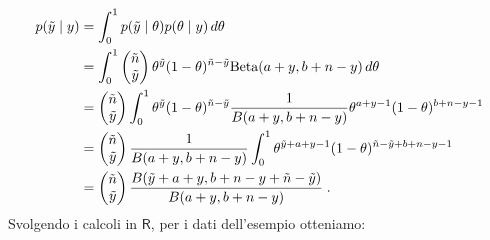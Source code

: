 \documentclass[
  10pt,
  italian,
  a4paper,
  extrafontsizes,onecolumn,openright
  ]{memoir}
\newcommand{\R}{\textsf{R}} %
\begin{document}
\begin{align}
p(\tilde{y} \mid y) &= \int_0^1 p(\tilde{y} \mid \theta)
p(\theta \mid y)\, d\theta \notag\\
 &= \int_0^1 \begin{pmatrix}\tilde{n}\\\tilde{y}\end{pmatrix}
 \theta^{\tilde{y}}
(1-\theta)^{\tilde{n}-\tilde{y}} \mbox{Beta}(a+y,b+n-y) \, d\theta \notag\\
&= \begin{pmatrix}{\tilde{n}}\\\tilde{y}\end{pmatrix} \int_0^1 \theta^{\tilde{y}}
(1-\theta)^{\tilde{n}-\tilde{y}} \frac{1}{B(a+y, b+n-y)}\theta^{a+y-1}(1-\theta)^{b+n-y-1}\notag\\
&= \begin{pmatrix}{\tilde{n}}\\\tilde{y}\end{pmatrix} \frac{1}{B(a+y, b+n-y)}\int_0^1 \theta^{\tilde{y}+a+y-1}(1-\theta)^{\tilde{n}-\tilde{y}+b+n-y-1}\notag\\
&= \begin{pmatrix}{\tilde{n}}\\\tilde{y}\end{pmatrix} \frac{B(\tilde{y}+a+y,b+n-y+\tilde{n}-\tilde{y})}{B(a+y, b+n-y)} \; .
\label{eq:post-yprime-an-sol-betabin}
\end{align}
Svolgendo i calcoli in \(\R\), per i dati dell'esempio otteniamo:
\end{document}
